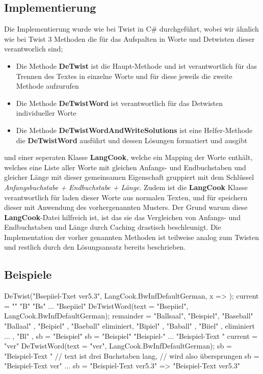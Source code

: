 \documentclass{article}
\begin{document}
\begin{flushleft}
\subsection{Implementierung}
Die Implementierung wurde wie bei Twist in C\# durchgeführt, wobei wir ähnlich wie bei Twist 3 Methoden die für das Aufspalten in Worte und Detwisten dieser verantworlich sind;
\begin{itemize}
\item Die Methode \textbf{DeTwist} ist die Haupt-Methode und ist verantwortlich für das Trennen des Textes in einzelne Worte und für diese jeweils die zweite Methode aufzurufen
\item Die Methode \textbf{DeTwistWord} ist verantwortlich für das Detwisten individueller Worte
\item Die Methode \textbf{DeTwistWordAndWriteSolutions} ist eine Helfer-Methode die \textbf{DeTwistWord} ausführt und dessen Lösungen formatiert und ausgibt
\end{itemize}
und einer seperaten Klasse \textbf{LangCook}, welche ein Mapping der Worte enthält, welches eine Liste aller Worte mit gleichen Anfangs- und Endbuchstaben und gleicher Länge mit dieser gemeinsamen Eigenschaft gruppiert mit dem Schlüssel \textit{Anfangsbuchstabe + Endbuchstabe + Länge}. 
Zudem ist die \textbf{LangCook} Klasse verantwortlich für laden dieser Worte aus normalen Texten, und für speichern dieser mit Anwendung des vorhergenannten Musters.
Der Grund warum diese \textbf{LangCook}-Datei hilfreich ist, ist das sie das Vergleichen von Anfangs- und Endbuchstaben und Länge durch Caching drastisch beschleunigt.
Die Implementation der vorher genannten Methoden ist teilweise analog zum Twisten und restlich durch den Lösungsansatz bereits beschrieben.

\newpage
\subsection{Beispiele}
\begin{Csharp}
DeTwist("Bsepiiel-Txet ver5.3", LangCook.BwInfDefaultGerman, x => {});
{
  current = ""
            "B"
	  	    "Bs"
		    ...
		    "Bsepiiel"
  DeTwistWord(text = "Bsepiiel", LangCook.BwInfDefaultGerman);
  {
  	remainder = { "Ballsaal", "Beispiel", "Baseball" }
  				{ "Ballaal" , "Beipiel" , "Baeball"  }
  				{ eliminiert, "Bipiel"  , "Baball"   }
  				{           , "Biiel"   , eliminiert }
  				...
  				{           , "Bl"      ,            }
    sb = "Beispiel"
  }
  sb = "Beispiel"
       "Beispiel-"
       ...
       "Beispiel-Text "
  current = "ver"
  DeTwistWord(text = "ver", LangCook.BwInfDefaultGerman);
  {
    sb = "Beispiel-Text "     // text ist drei Buchstaben lang, 
                              // wird also übersprungen
    sb = "Beispiel-Text ver"
  }
  ...
  sb = "Beispiel-Text ver5.3"
}
=> "Beispiel-Text ver5.3"
\end{Csharp}


\end{flushleft}
\end{document}
